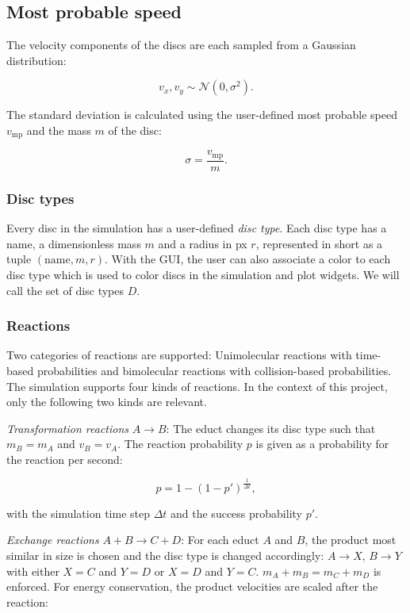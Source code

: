 \documentclass[a4paper]{scrartcl}
\begin{document}
\subsection*{Most probable speed}
The velocity components of the discs are each sampled from a Gaussian distribution:

\begin{equation*}
    v_x, v_y \sim \mathcal{N}(0, \sigma^2).
\end{equation*}

The standard deviation is calculated using the user-defined most probable speed $v_{\text{mp}}$ and the mass $m$ of the disc:

\begin{equation*}
    \sigma = \frac{v_{\text{mp}}}{m}.
\end{equation*}

\subsubsection*{Disc types}
Every disc in the simulation has a user-defined \textit{disc type}. Each disc type has a name, a dimensionless mass $m$ and a radius in px $r$, represented in short as a tuple $(\text{name}, m, r)$. With the GUI, the user can also associate a color to each disc type which is used to color discs in the simulation and plot widgets. We will call the set of disc types $D$.

\subsubsection*{Reactions}
Two categories of reactions are supported: Unimolecular reactions with time-based probabilities and bimolecular reactions with collision-based probabilities. The simulation supports four kinds of reactions. In the context of this project, only the following two kinds are relevant.

\textit{Transformation reactions} $A \rightarrow B$: The educt changes its disc type such that $m_B = m_A$ and $v_B = v_A$. The reaction probability $p$ is given as a probability for the reaction per second:

\begin{equation*}
    p = 1 - (1-p')^{\frac{1}{\Delta t}},
\end{equation*}

with the simulation time step $\Delta t$ and the success probability $p'$.

\textit{Exchange reactions} $A + B \rightarrow C + D$: For each educt $A$ and $B$, the product most similar in size is chosen and the disc type is changed accordingly: $A \rightarrow X$, $B \rightarrow Y$ with either $X = C$ and $Y = D$ or $X = D$ and $Y = C$. $m_A + m_B = m_C + m_D$ is enforced. For energy conservation, the product velocities are scaled after the reaction:
\end{document}
